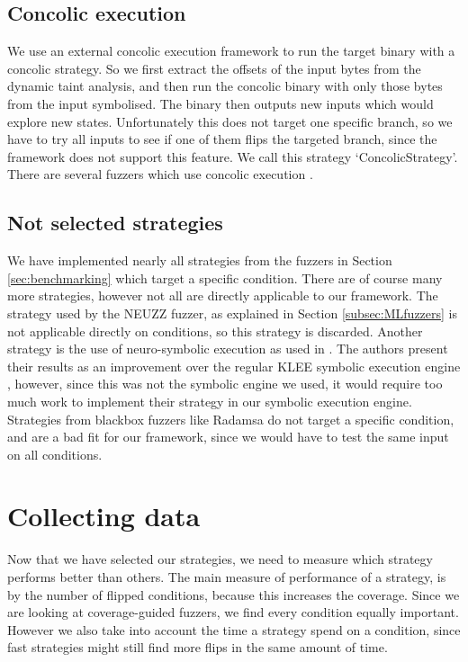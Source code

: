 \subsection{Concolic execution}
We use an external concolic execution framework to run the target binary with a concolic strategy. So we first extract the offsets of the input bytes from the dynamic taint analysis, and then run the concolic binary with only those bytes from the input symbolised. The binary then outputs new inputs which would explore new states. Unfortunately this does not target one specific branch, so we have to try all inputs to see if one of them flips the targeted branch, since the framework does not support this feature. We call this strategy `ConcolicStrategy'. There are several fuzzers which use concolic execution \cite{stephens2016driller, yun2018qsym, poeplau2020symbolic}.

\subsection{Not selected strategies}
We have implemented nearly all strategies from the fuzzers in Section \ref{sec:benchmarking} which target a specific condition.
There are of course many more strategies, however not all are directly applicable to our framework. 
The strategy used by the NEUZZ fuzzer\cite{she2019neuzz}, as explained in Section \ref{subsec:MLfuzzers} is not applicable directly on conditions, so this strategy is discarded. 
Another strategy is the use of neuro-symbolic execution as used in \cite{shen2019neuro}. The authors present their results as an improvement over the regular KLEE symbolic execution engine \cite{cadar2008klee}, however, since this was not the symbolic engine we used, it would require too much work to implement their strategy in our symbolic execution engine. Strategies from blackbox fuzzers like Radamsa \cite{helin2018radamsa} do not target a specific condition, and are a bad fit for our framework, since we would have to test the same input on all conditions.


\section{Collecting data}\label{sec:collecting-data}
Now that we have selected our strategies, we need to measure which strategy performs better than others. The main measure of performance of a strategy, is by the number of flipped conditions, because this increases the coverage. Since we are looking at coverage-guided fuzzers, we find every condition equally important. However we also take into account the time a strategy spend on a condition, since fast strategies might still find more flips in the same amount of time.

